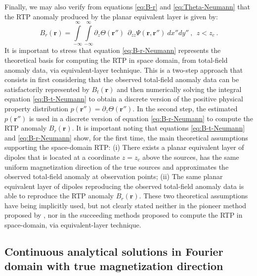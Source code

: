 Finally, we may also verify from equations \ref{eq:B-r} and \ref{eq:Theta-Neumann} 
that the RTP anomaly produced by the planar equivalent layer is given by:
\begin{equation}
B_{r}(\mathbf{r}) = 
\int\limits_{-\infty}^{\infty} \int\limits_{-\infty}^{\infty}
\partial_{z} \Theta(\mathbf{r}'') \:\: 
\partial_{zz} \Psi(\mathbf{r}, \mathbf{r}'') \: 
dx''dy'' \: , \:\: z < z_{c} \: .
\label{eq:B-r-Neumann}
\end{equation}
It is important to stress that equation \ref{eq:B-r-Neumann} represents the 
theoretical basis for computing the RTP in space domain, from total-field
anomaly data, via equivalent-layer technique.
This is a two-step approach that consists in first considering that the observed 
total-field anomaly data can be satisfactorily represented by 
$B_{t}(\mathbf{r})$ and then numerically solving the integral 
equation \ref{eq:B-t-Neumann} to obtain a discrete version of the positive physical 
property distribution $p(\mathbf{r}'') = \partial_{z} \Theta(\mathbf{r}'')$.
In the second step, the estimated $p(\mathbf{r}'')$ is used in 
a discrete version of equation \ref{eq:B-r-Neumann} to compute the RTP anomaly 
$B_{r}(\mathbf{r})$. It is important noting that equations \ref{eq:B-t-Neumann}
and \ref{eq:B-r-Neumann} show, for the first time, the main 
theoretical assumptions supporting the space-domain RTP: 
(i) There exists a planar equivalent layer of dipoles that is located at a coordinate 
$z = z_{c}$ above the sources, has the same uniform magnetization direction of the 
true sources
and approximates the observed total-field anomaly at observation points;
(ii) The same planar equivalent layer of dipoles reproducing the observed total-field
anomaly data is able to reproduce the RTP anomaly $B_{r}(\mathbf{r})$.
These two theoretical assumptions have being implicitly used, but not clearly stated 
neither in the pioneer method proposed by \cite{silva_1986}, nor in the succeeding 
methods \cite[e.g.,][]{leao-silva_1989, oliveirajr-etal_2013, li_etal_2014, reis_etal2020}
proposed to compute the RTP in space-domain, via equivalent-layer technique.


\subsection{Continuous analytical solutions in Fourier domain with true magnetization direction}
\label{subsec:Fourier_domain_true_mag}


